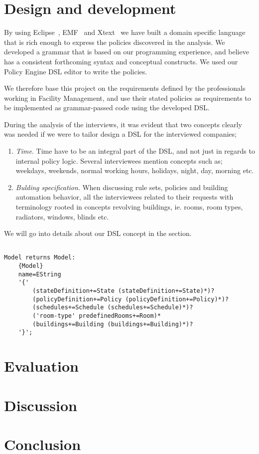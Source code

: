 \documentclass{llncs}
\begin{document}
\section{Design and development}\label{sec:dsldesign}
By using Eclipse~\cite{eclipse}, EMF~\cite{emf} and Xtext~\cite{xtext} we have built a domain specific language that is rich enough to express the policies discovered in the analysis. We developed a grammar that is based on our programming experience, and believe has a consistent forthcoming syntax and conceptual constructs. We used our Policy Engine DSL editor to write the policies.

We therefore base this project on the requirements defined by the professionals working in Facility Management, and use their stated policies as requirements to be implemented as grammar-passed code using the developed DSL.

During the analysis of the interviews, it was evident that two concepts clearly was needed if we were to tailor design a DSL for the interviewed companies;
\begin{enumerate}
	\item \textit{Time}. Time have to be an integral part of the DSL, and not just in regards to internal policy logic. Several interviewees mention concepts such as; weekdays, weekends, normal working hours, holidays, night, day, morning etc.
	\item \textit{Bulding specification}. When discussing rule sets, policies and building automation behavior, all the interviewees related to their requests with terminology rooted in concepts revolving buildings, ie. rooms, room types, radiators, windows, blinds etc.
\end{enumerate}

We will go into details about our DSL concept in the  section.

\begin{lstlisting}[language=Xtext, caption={Just a test}, label={lst:Test}]

Model returns Model:
	{Model}
	name=EString
	'{'
		(stateDefinition+=State (stateDefinition+=State)*)?
		(policyDefinition+=Policy (policyDefinition+=Policy)*)?
		(schedules+=Schedule (schedules+=Schedule)*)?
		('room-type' predefinedRooms+=Room)*
		(buildings+=Building (buildings+=Building)*)?
	'}';

\end{lstlisting}

\section{Evaluation}\label{sec:evaluation}

\section{Discussion}\label{sec:discussion}

\section{Conclusion}\label{sec:conclusion}

{}

\end{document}
